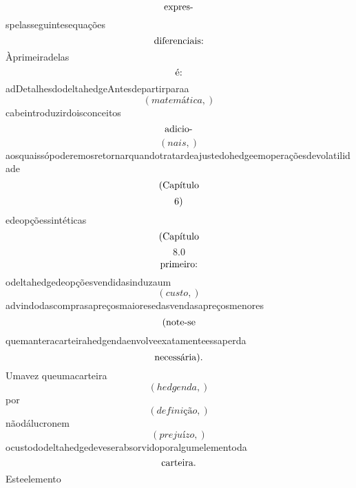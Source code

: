 \documentclass{article}
\begin{document}
\begin{equation}
$expres-$
\end{equation}spelasseguintesequações\begin{equation}
$diferenciais:$
\end{equation}Àprimeiradelas\begin{equation}
$é:$
\end{equation}adDetalhesdodeltahedgeAntesdepartirparaa\begin{equation}
\left( matemática,\right)
\end{equation}cabeintroduzirdoisconceitos\begin{equation}
$adicio-$
\end{equation}\begin{equation}
\left( nais,\right)
\end{equation}aosquaissópoderemosretornarquandotratardeajustedohedgeemoperaçõesdevolatilidade\begin{equation}
$(Capítulo$
\end{equation}\begin{equation}
$6)$
\end{equation}edeopçõessintéticas\begin{equation}
$(Capítulo$
\end{equation}\begin{equation}
8.0
\end{equation}\begin{equation}
$primeiro:$
\end{equation}odeltahedgedeopçõesvendidasinduzaum\begin{equation}
\left( custo,\right)
\end{equation}advindodascomprasapreçosmaioresedasvendasapreçosmenores\begin{equation}
$(note-se$
\end{equation}quemanteracarteirahedgendaenvolveexatamenteessaperda\begin{equation}
$necessária).$
\end{equation}Umavez queumacarteira\begin{equation}
\left( hedgenda,\right)
\end{equation}por\begin{equation}
\left( definição,\right)
\end{equation}nãodálucronem\begin{equation}
\left( prejuízo,\right)
\end{equation}ocustododeltahedgedeveserabsorvidoporalgumelementoda\begin{equation}
$carteira.$
\end{equation}Esteelemento\begin{equation}

\end{equation}
\end{document}
